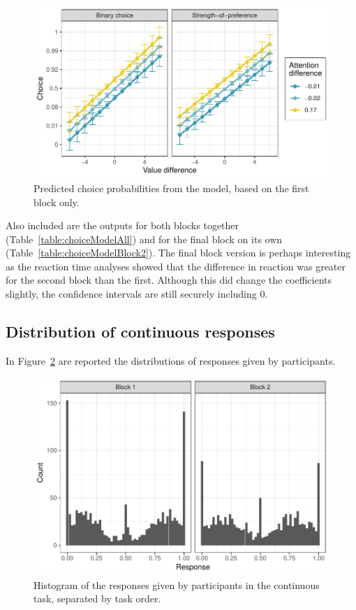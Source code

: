 \documentclass[12pt]{article}
\begin{document}




\begin{figure}
	\includegraphics{images/predictedChoiceGraph}
	\caption{Predicted choice probabilities from the model, based on the first block only.}
	\label{figure:predictedChoiceGraph}	
\end{figure}


Also included are the outputs for both blocks together (Table~\ref{table:choiceModelAll}) and for the final block on its own (Table~\ref{table:choiceModelBlock2}). The final block version is perhaps interesting as the reaction time analyses showed that the difference in reaction was greater for the second block than the first. Although this did change the coefficients slightly, the confidence intervals are still securely including 0. 

\subsection{Distribution of continuous responses}
In Figure~\ref{figure:continuousResponses} are reported the distributions of responses given by participants. 

\begin{figure}[!b]
	\centering
	\includegraphics{images/continuousResponses}
	\caption{Histogram of the responses given by participants in the continuous task, separated by task order.}
	\label{figure:continuousResponses}
\end{figure}
\end{document}
